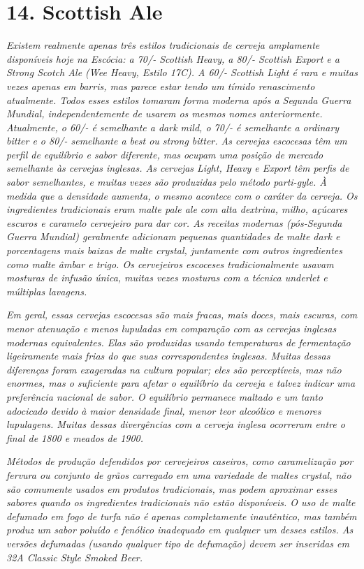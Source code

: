 \section*{14. Scottish Ale}
\textit{Existem realmente apenas três estilos tradicionais de cerveja amplamente disponíveis hoje na Escócia: a 70/- Scottish Heavy, a 80/- Scottish Export e a Strong Scotch Ale (Wee Heavy, Estilo 17C). A 60/- Scottish Light é rara e muitas vezes apenas em barris, mas parece estar tendo um tímido renascimento atualmente. Todos esses estilos tomaram forma moderna após a Segunda Guerra Mundial, independentemente de usarem os mesmos nomes anteriormente. Atualmente, o 60/- é semelhante a dark mild, o 70/- é semelhante a ordinary bitter e o 80/- semelhante a best ou strong bitter. As cervejas escocesas têm um perfil de equilíbrio e sabor diferente, mas ocupam uma posição de mercado semelhante às cervejas inglesas. As cervejas Light, Heavy e Export têm perfis de sabor semelhantes, e muitas vezes são produzidas pelo método parti-gyle. À medida que a densidade aumenta, o mesmo acontece com o caráter da cerveja. Os ingredientes tradicionais eram malte pale ale com alta dextrina, milho, açúcares escuros e caramelo cervejeiro para dar cor. As receitas modernas (pós-Segunda Guerra Mundial) geralmente adicionam pequenas quantidades de malte dark e porcentagens mais baixas de malte crystal, juntamente com outros ingredientes como malte âmbar e trigo. Os cervejeiros escoceses tradicionalmente usavam mosturas de infusão única, muitas vezes mosturas com a técnica underlet e múltiplas lavagens.}

\textit{Em geral, essas cervejas escocesas são mais fracas, mais doces, mais escuras, com menor atenuação e menos lupuladas em comparação com as cervejas inglesas modernas equivalentes. Elas são produzidas usando temperaturas de fermentação ligeiramente mais frias do que suas correspondentes inglesas. Muitas dessas diferenças foram exageradas na cultura popular; eles são perceptíveis, mas não enormes, mas o suficiente para afetar o equilíbrio da cerveja e talvez indicar uma preferência nacional de sabor. O equilíbrio permanece maltado e um tanto adocicado devido à maior densidade final, menor teor alcoólico e menores lupulagens. Muitas dessas divergências com a cerveja inglesa ocorreram entre o final de 1800 e meados de 1900.}

\textit{Métodos de produção defendidos por cervejeiros caseiros, como caramelização por fervura ou conjunto de grãos carregado em uma variedade de maltes crystal, não são comumente usados em produtos tradicionais, mas podem aproximar esses sabores quando os ingredientes tradicionais não estão disponíveis. O uso de malte defumado em fogo de turfa não é apenas completamente inautêntico, mas também produz um sabor poluído e fenólico inadequado em qualquer um desses estilos. As versões defumadas (usando qualquer tipo de defumação) devem ser inseridas em 32A Classic Style Smoked Beer. }

